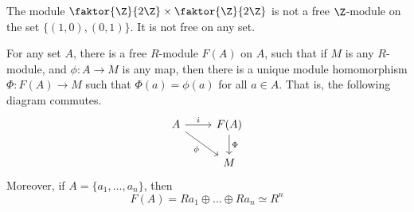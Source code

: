 \begin{example}\label{example_4.7}
    The module $\faktor{\Z}{2\Z} \times \faktor{\Z}{2\Z}$ is not a free
    $\Z$-module on the set $\{(1,0),(0,1)\}$. It is not free on any set.
\end{example}

\begin{theorem}\label{4.3.3}
    For any set $A$, there is a free  $R$-module  $F(A)$ on $A$, such that if
    $M$ is any  $R$-module, and  $\phi:A \xrightarrow{} M$ is any map, then
    there is a unique module homomorphism $\Phi:F(A) \xrightarrow{} M$ such that
    $\Phi(a)=\phi(a)$ for all $a \in A$. That is, the following diagram
    commutes.
    \[\begin{tikzcd}
        A & {F(A)} \\
        & M
        \arrow["i", from=1-1, to=1-2]
        \arrow["\Phi", from=1-2, to=2-2]
        \arrow["\phi"', from=1-1, to=2-2]
    \end{tikzcd}\]
    Moreover, if $A=\{a_1, \dots, a_n\}$, then
    \begin{equation*}
        F(A)=Ra_1 \oplus \dots \oplus Ra_n \simeq R^n
    \end{equation*}
\end{theorem}
